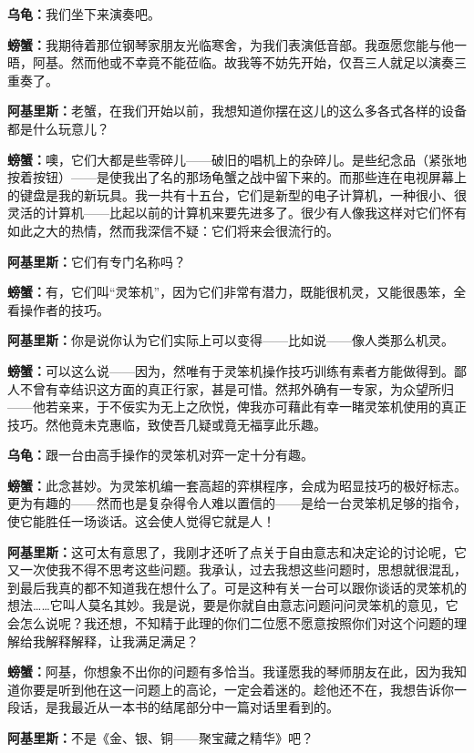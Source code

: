 \documentclass[
  12pt,
  twoside,
  openright,
  oldfontcommands,
]{memoir}
\newcommand{\kaitismall}[1]{{\kaitifamily\small #1}}
\newcommand{\dialogname}[1]{{\sffamily\bfseries #1}}
\begin{document}
\dialogname{乌龟：}我们坐下来演奏吧。

\dialogname{螃蟹：}我期待着那位钢琴家朋友光临寒舍，为我们表演低音部。我亟愿您能与他一晤，阿基。然而他或不幸竟不能莅临。故我等不妨先开始，仅吾三人就足以演奏三重奏了。

\dialogname{阿基里斯：}老蟹，在我们开始以前，我想知道你摆在这儿的这么多各式各样的设备都是什么玩意儿？

\dialogname{螃蟹：}噢，它们大都是些零碎儿------破旧的唱机上的杂碎儿。是些纪念品\kaitismall{（紧张地按着按钮）}------是使我出了名的那场龟蟹之战中留下来的。而那些连在电视屏幕上的键盘是我的新玩具。我一共有十五台，它们是新型的电子计算机，一种很小、很灵活的计算机------比起以前的计算机来要先进多了。很少有人像我这样对它们怀有如此之大的热情，然而我深信不疑：它们将来会很流行的。

\dialogname{阿基里斯：}它们有专门名称吗？

\dialogname{螃蟹：}有，它们叫``灵笨机''，因为它们非常有潜力，既能很机灵，又能很愚笨，全看操作者的技巧。

\dialogname{阿基里斯：}你是说你认为它们实际上可以变得------比如说------像人类那么机灵。

\dialogname{螃蟹：}可以这么说------因为，然唯有于灵笨机操作技巧训练有素者方能做得到。鄙人不曾有幸结识这方面的真正行家，甚是可惜。然邦外确有一专家，为众望所归------他若亲来，于不佞实为无上之欣悦，俾我亦可藉此有幸一睹灵笨机使用的真正技巧。然他竟未克惠临，致使吾几疑或竟无福享此乐趣。

\dialogname{乌龟：}跟一台由高手操作的灵笨机对弈一定十分有趣。

\dialogname{螃蟹：}此念甚妙。为灵笨机编一套高超的弈棋程序，会成为昭显技巧的极好标志。更为有趣的------然而也是复杂得令人难以置信的------是给一台灵笨机足够的指令，使它能胜任一场谈话。这会使人觉得它就是人！

\dialogname{阿基里斯：}这可太有意思了，我刚才还听了点关于自由意志和决定论的讨论呢，它又一次使我不得不思考这些问题。我承认，过去我想这些问题时，思想就很混乱，到最后我真的都不知道我在想什么了。可是这种有关一台可以跟你谈话的灵笨机的想法\ldots\ldots 它叫人莫名其妙。我是说，要是你就自由意志问题问问灵笨机的意见，它会怎么说呢？我还想，不知精于此理的你们二位愿不愿意按照你们对这个问题的理解给我解释解释，让我满足满足？

\dialogname{螃蟹：}阿基，你想象不出你的问题有多恰当。我谨愿我的琴师朋友在此，因为我知道你要是听到他在这一问题上的高论，一定会着迷的。趁他还不在，我想告诉你一段话，是我最近从一本书的结尾部分中一篇对话里看到的。

\dialogname{阿基里斯：}不是《金、银、铜------聚宝藏之精华》吧？
\end{document}
